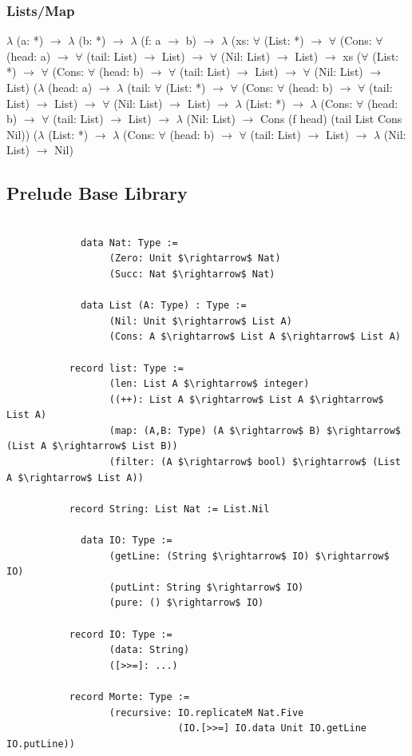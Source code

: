 \documentclass[11pt,oneside]{article}
\begin{document}
\subsubsection*{Lists/Map}
{\selectfont
\vspace{0.5cm}
$\lambda$ (a: *) $\rightarrow$ $\lambda$ (b: *) $\rightarrow$ $\lambda$ (f: a $\rightarrow$ b) $\rightarrow$ $\lambda$ (xs: $\forall$ (List: *)
$\rightarrow$ $\forall$ (Cons: $\forall$ (head: a) $\rightarrow$ $\forall$ (tail: List) $\rightarrow$ List) $\rightarrow$ $\forall$ (Nil: List) $\rightarrow$ List)
$\rightarrow$ xs ($\forall$ (List: *) $\rightarrow$ $\forall$ (Cons: $\forall$ (head: b) $\rightarrow$ $\forall$ (tail: List) $\rightarrow$ List)
$\rightarrow$ $\forall$ (Nil: List) $\rightarrow$ List) ($\lambda$ (head: a) $\rightarrow$ $\lambda$ (tail: $\forall$ (List: *) $\rightarrow$
$\forall$ (Cons: $\forall$ (head: b) $\rightarrow$ $\forall$ (tail: List) $\rightarrow$ List) $\rightarrow$ $\forall$ (Nil: List)
$\rightarrow$ List) $\rightarrow$ $\lambda$ (List: *) $\rightarrow$ $\lambda$ (Cons: $\forall$ (head: b) $\rightarrow$ $\forall$
(tail: List) $\rightarrow$ List) $\rightarrow$ $\lambda$ (Nil: List) $\rightarrow$ Cons (f head) (tail List Cons Nil))
($\lambda$ (List: *) $\rightarrow$ $\lambda$ (Cons: $\forall$ (head: b) $\rightarrow$ $\forall$ (tail: List) $\rightarrow$
List) $\rightarrow$ $\lambda$ (Nil: List) $\rightarrow$ Nil)
}

\newpage
\subsection{Prelude Base Library}

\begin{lstlisting}[mathescape=true]

             data Nat: Type :=
                  (Zero: Unit $\rightarrow$ Nat)
                  (Succ: Nat $\rightarrow$ Nat)

             data List (A: Type) : Type :=
                  (Nil: Unit $\rightarrow$ List A)
                  (Cons: A $\rightarrow$ List A $\rightarrow$ List A)

           record list: Type :=
                  (len: List A $\rightarrow$ integer)
                  ((++): List A $\rightarrow$ List A $\rightarrow$ List A)
                  (map: (A,B: Type) (A $\rightarrow$ B) $\rightarrow$ (List A $\rightarrow$ List B))
                  (filter: (A $\rightarrow$ bool) $\rightarrow$ (List A $\rightarrow$ List A))

           record String: List Nat := List.Nil

             data IO: Type :=
                  (getLine: (String $\rightarrow$ IO) $\rightarrow$ IO)
                  (putLint: String $\rightarrow$ IO)
                  (pure: () $\rightarrow$ IO)

           record IO: Type :=
                  (data: String)
                  ([>>=]: ...)

           record Morte: Type :=
                  (recursive: IO.replicateM Nat.Five
                              (IO.[>>=] IO.data Unit IO.getLine IO.putLine))

\end{lstlisting}
\end{document}
